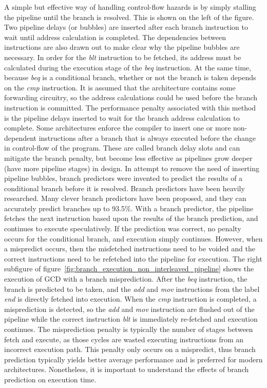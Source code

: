A simple but effective way of handling control-flow hazards is by simply stalling the pipeline until the branch is resolved.
This is shown on the left of the figure. 
Two pipeline delays (or bubbles) are inserted after each branch instruction to wait until address calculation is completed.
The dependencies between instructions are also drawn out to make clear why the pipeline bubbles are necessary.
In order for the \emph{blt} instruction to be fetched, its address must be calculated during the execution stage of the \emph{beq} instruction.
At the same time, because \emph{beq} is a conditional branch, whether or not the branch is taken depends on the \emph{cmp} instruction.
It is assumed that the architecture contains some forwarding circuitry, so the address calculations could be used before the branch instruction is committed.        
The performance penalty associated with this method is the pipeline delays inserted to wait for the branch address calculation to complete. 
Some architectures enforce the compiler to insert one or more non-dependent instructions after a branch that is always executed before the change in control-flow of the program. 
These are called branch delay slots and can mitigate the branch penalty, but become less effective as pipelines grow deeper (have more pipeline stages) in design. 
In attempt to remove the need of inserting pipeline bubbles, branch predictors were invented to predict the results of a conditional branch before it is resolved.
Branch predictors have been heavily researched.
Many clever branch predictors have been proposed, and they can accurately predict branches up to 93.5\%.
With a branch predictor, the pipeline fetches the next instruction based upon the results of the branch prediction, and continues to execute speculatively. 
If the prediction was correct, no penalty occurs for the conditional branch, and execution simply continues. 
However, when a mispredict occurs, then the misfetched instructions need to be voided and the correct instructions need to be refetched into the pipeline for execution.
The right subfigure of figure~\ref{fig:branch_execution_non_interleaved_pipeline} shows the execution of GCD with a branch misprediction.
After the \emph{beq} instruction, the branch is predicted to be taken, and the \emph{add} and \emph{mov} instructions from the label \emph{end} is directly fetched into execution. 
When the \emph{cmp} instruction is completed, a misprediction is detected, so the \emph{add} and \emph{mov} instruction are flushed out of the pipeline while the correct instruction \emph{blt} is immediately re-fetched and execution continues.
The misprediction penalty is typically the number of stages between fetch and execute, as those cycles are wasted executing instructions from an incorrect execution path.
This penalty only occurs on a mispredict, thus branch prediction typically yields better average performance and is preferred for modern architectures.
Nonetheless, it is important to understand the effects of branch prediction on execution time. 

